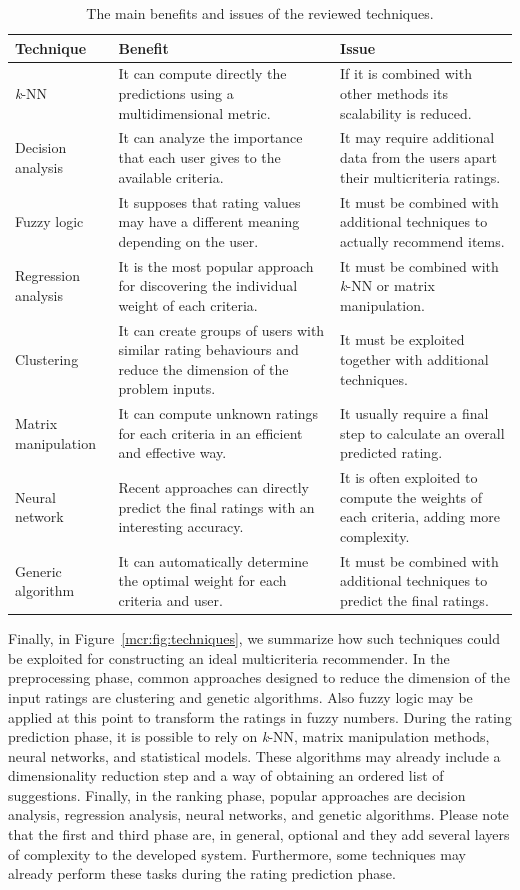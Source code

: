 \begin{table}
\begin{tabularx}{\linewidth}{lXX}
\toprule
Technique & Benefit & Issue \\ \midrule
\textit{k}-NN & It can compute directly the predictions using a multidimensional metric. & If it is combined with other methods its scalability is reduced. \\
Decision analysis & It can analyze the importance that each user gives to the available criteria. & It may require additional data from the users apart their multicriteria ratings. \\
Fuzzy logic & It supposes that rating values may have a different meaning depending on the user. & It must be combined with additional techniques to actually recommend items. \\
Regression analysis & It is the most popular approach for discovering the individual weight of each criteria. & It must be combined with \textit{k}-NN or matrix manipulation. \\
Clustering & It can create groups of users with similar rating behaviours and reduce the dimension of the problem inputs. & It must be exploited together with additional techniques. \\
Matrix manipulation & It can compute unknown ratings for each criteria in an efficient and effective way. & It usually require a final step to calculate an overall predicted rating. \\
Neural network & Recent approaches can directly predict the final ratings with an interesting accuracy. & It is often exploited to compute the weights of each criteria, adding more complexity. \\
Generic algorithm & It can automatically determine the optimal weight for each criteria and user. & It must be combined with additional techniques to predict the final ratings. \\ \bottomrule
\end{tabularx}
\caption[Benefits and issues of the techniques]{The main benefits and issues of the reviewed techniques.}
\label{mcr:tab:comparison}
\end{table}

Finally, in Figure~\ref{mcr:fig:techniques}, we summarize how such techniques could be exploited for constructing an ideal multicriteria recommender. In the preprocessing phase, common approaches designed to reduce the dimension of the input ratings are clustering and genetic algorithms. Also fuzzy logic may be applied at this point to transform the ratings in fuzzy numbers. During the rating prediction phase, it is possible to rely on \textit{k}-NN, matrix manipulation methods, neural networks, and statistical models. These algorithms may already include a dimensionality reduction step and a way of obtaining an ordered list of suggestions. Finally, in the ranking phase, popular approaches are decision analysis, regression analysis, neural networks, and genetic algorithms. Please note that the first and third phase are, in general, optional and they add several layers of complexity to the developed system. Furthermore, some techniques may already perform these tasks during the rating prediction phase.

